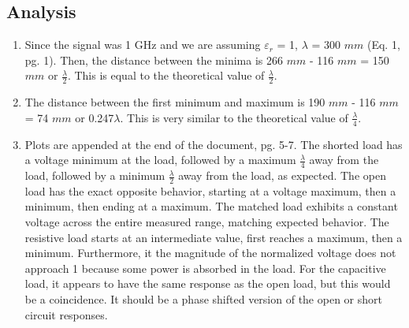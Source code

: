 \documentclass{article}
\begin{document}
\subsection{Analysis}
\begin{enumerate}
	\item Since the signal was 1 GHz and we are assuming $\varepsilon_r$ = 1, $\lambda$ = 300 $mm$ (Eq. 1, pg. 1). Then, the distance between the minima is 266 $mm$ - 116 $mm$ = 150 $mm$ or $\frac{\lambda}{2}$. This is equal to the theoretical value of $\frac{\lambda}{2}$.
	
	\item The distance between the first minimum and maximum is 190 $mm$ - 116 $mm$ = 74 $mm$ or 0.247$\lambda$. This is very similar to the theoretical value of $\frac{\lambda}{4}$.
	
	\item Plots are appended at the end of the document, pg. 5-7. The shorted load has a voltage minimum at the load, followed by a maximum $\frac{\lambda}{4}$ away from the load, followed by a minimum $\frac{\lambda}{2}$ away from the load, as expected. The open load has the exact opposite behavior, starting at a voltage maximum, then a minimum, then ending at a maximum. The matched load exhibits a constant voltage across the entire measured range, matching expected behavior. The resistive load starts at an intermediate value, first reaches a maximum, then a minimum. Furthermore, it the magnitude of the normalized voltage does not approach 1 because some power is absorbed in the load. For the capacitive load, it appears to have the same response as the open load, but this would be a coincidence. It should be a phase shifted version of the open or short circuit responses.


\end{enumerate}
\end{document}
